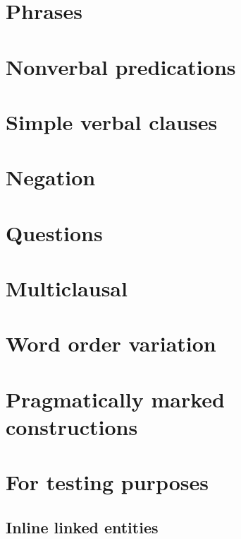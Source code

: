 \documentclass{memoir}
\begin{document}
\chapter{\texorpdfstring{Phrases \label{phrases}}{Phrases }}

\chapter{\texorpdfstring{Nonverbal predications
\label{nonverbal}}{Nonverbal predications }}

\chapter{\texorpdfstring{Simple verbal clauses
\label{simpleverb}}{Simple verbal clauses }}

\chapter{\texorpdfstring{Negation \label{negation}}{Negation }}

\chapter{\texorpdfstring{Questions \label{questions}}{Questions }}

\chapter{\texorpdfstring{Multiclausal
\label{multiclausal}}{Multiclausal }}

\chapter{\texorpdfstring{Word order variation
\label{wordorder}}{Word order variation }}

\chapter{\texorpdfstring{Pragmatically marked constructions
\label{marked}}{Pragmatically marked constructions }}

\chapter{For testing purposes}

\section{Inline linked entities}
\end{document}
